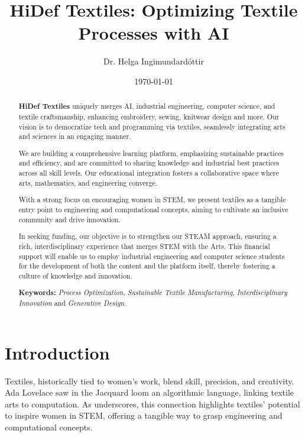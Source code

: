 \documentclass{article}
\title{HiDef Textiles: Optimizing Textile Processes with AI}
\author{Dr. Helga Ingimundardóttir}
\date{\today}
\begin{document}
    \maketitle

    \begin{abstract}
        \textbf{HiDef Textiles} uniquely merges AI, industrial engineering, computer science, and textile craftsmanship,
        enhancing embroidery, sewing, knitwear design and more. Our vision is to democratize tech and programming via
        textiles, seamlessly integrating arts and sciences in an engaging manner.

        We are building a comprehensive learning platform, emphasizing sustainable practices and efficiency, and are
        committed to sharing knowledge and industrial best practices across all skill levels. Our educational
        integration fosters a collaborative space where arts, mathematics, and engineering converge.

        With a strong focus on encouraging women in STEM, we present textiles as a tangible entry point to
        engineering and computational concepts, aiming to cultivate an inclusive community and drive innovation.

        In seeking funding, our objective is to strengthen our STEAM approach, ensuring a rich, interdisciplinary
        experience that merges STEM with the Arts. This financial support will enable us to employ industrial
        engineering and computer science students for the development of both the content and the platform itself,
        thereby fostering a culture of knowledge and innovation.

        \noindent \textbf{Keywords:} \textit{Process Optimization}, \textit{Sustainable Textile Manufacturing},
        \textit{Interdisciplinary Innovation} and \textit{Generative Design}.
    \end{abstract}


    \section{Introduction}

    Textiles, historically tied to women's work, blend skill, precision, and creativity. Ada Lovelace
    saw in the Jacquard loom an algorithmic language, linking textile arts to computation. As
    \citet{sadieplant} underscores, this connection highlights textiles' potential to inspire women in
    STEM, offering a tangible way to grasp engineering and computational concepts.
\end{document}
